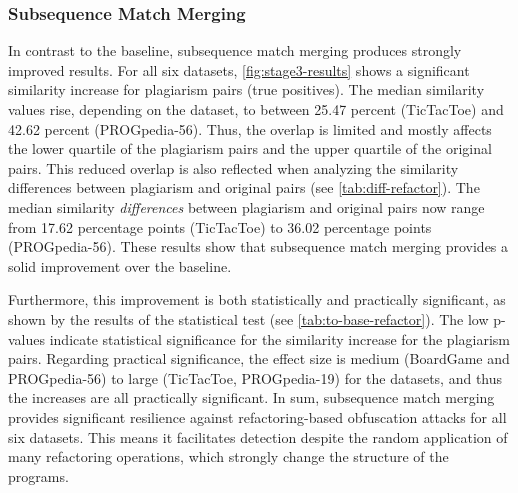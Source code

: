 \subsubsection{Subsequence Match Merging}
In contrast to the baseline, subsequence match merging produces strongly improved results.
For all six datasets, \autoref{fig:stage3-results} shows a significant similarity increase for plagiarism pairs (true positives).
The median similarity values rise, depending on the dataset, to between 25.47 percent (TicTacToe) and 42.62 percent (PROGpedia-56).
Thus, the overlap is limited and mostly affects the lower quartile of the plagiarism pairs and the upper quartile of the original pairs.
This reduced overlap is also reflected when analyzing the similarity differences between plagiarism and original pairs (see \autoref{tab:diff-refactor}).
The median similarity \textit{differences} between plagiarism and original pairs now range from 17.62 percentage points (TicTacToe) to 36.02 percentage points (PROGpedia-56).
These results show that subsequence match merging provides a solid improvement over the baseline. 

Furthermore, this improvement is both statistically and practically significant, as shown by the results of the statistical test (see \autoref{tab:to-base-refactor}).
The low p-values indicate statistical significance for the similarity increase for the plagiarism pairs.
Regarding practical significance, the effect size is medium (BoardGame and PROGpedia-56) to large (TicTacToe, PROGpedia-19) for the datasets, and thus the increases are all practically significant.
In sum, subsequence match merging provides significant resilience against refactoring-based obfuscation attacks for all six datasets.
This means it facilitates detection despite the random application of many refactoring operations, which strongly change the structure of the programs.

